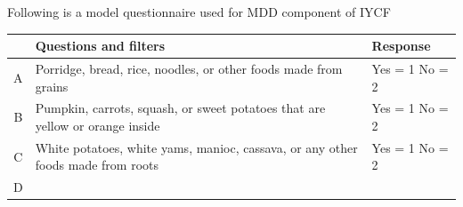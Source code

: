 \documentclass[12pt,]{book}
\theoremstyle{definition}
\theoremstyle{definition}
\theoremstyle{definition}
\theoremstyle{remark}
\begin{document}
Following is a model questionnaire used for MDD component of IYCF

\begin{longtable}[]{@{}cll@{}}
\toprule
\begin{minipage}[b]{0.06\columnwidth}\centering
\strut
\end{minipage} & \begin{minipage}[b]{0.68\columnwidth}\raggedright
\textbf{Questions and filters}\strut
\end{minipage} & \begin{minipage}[b]{0.18\columnwidth}\raggedright
\textbf{Response}\strut
\end{minipage}\tabularnewline
\midrule
\endhead
\begin{minipage}[t]{0.06\columnwidth}\centering
A\strut
\end{minipage} & \begin{minipage}[t]{0.68\columnwidth}\raggedright
Porridge, bread, rice, noodles, or other foods made from grains\strut
\end{minipage} & \begin{minipage}[t]{0.18\columnwidth}\raggedright
Yes = 1 No = 2\strut
\end{minipage}\tabularnewline
\begin{minipage}[t]{0.06\columnwidth}\centering
B\strut
\end{minipage} & \begin{minipage}[t]{0.68\columnwidth}\raggedright
Pumpkin, carrots, squash, or sweet potatoes that are yellow or orange
inside\strut
\end{minipage} & \begin{minipage}[t]{0.18\columnwidth}\raggedright
Yes = 1 No = 2\strut
\end{minipage}\tabularnewline
\begin{minipage}[t]{0.06\columnwidth}\centering
C\strut
\end{minipage} & \begin{minipage}[t]{0.68\columnwidth}\raggedright
White potatoes, white yams, manioc, cassava, or any other foods made
from roots\strut
\end{minipage} & \begin{minipage}[t]{0.18\columnwidth}\raggedright
Yes = 1 No = 2\strut
\end{minipage}\tabularnewline
\begin{minipage}[t]{0.06\columnwidth}\centering
D\strut
\end{minipage} & \begin{minipage}[t]{0.68\columnwidth}\raggedright

\end{minipage}
\end{longtable}
\end{document}
